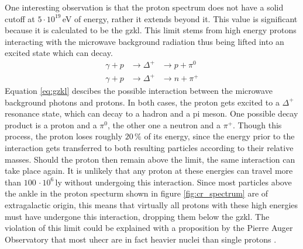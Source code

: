 \documentclass[abstract,toc,los,lof,english,10pt,glossary,acronyms]{jluthesis}
\begin{document}
One interesting observation is that the proton spectrum does not have a solid cutoff at $5\cdot10^{19}$\,eV of energy, rather it extends beyond it. This value is significant because it is calculated to be the \acrfull{gzkl}\cite{2021APh...12602526B}. This limit stems from high energy protons interacting with the microwave background radiation thus being lifted into an excited state which can decay.
\begin{equation}\label{eq:gzkl}
	\begin{aligned}
		\gamma + p &\rightarrow \Delta^+ &\rightarrow p + \pi^0 \\
		\gamma + p &\rightarrow \Delta^+ &\rightarrow n + \pi^+
	\end{aligned}
\end{equation}
Equation \ref{eq:gzkl} descibes the possible interaction between the microwave background photons and protons. In both cases, the proton gets excited to a $\Delta^+$ resonance state, which can decay to a hadron and a pi meson. One possible decay product is a proton and a $\pi^0$, the other one a neutron and a $\pi^+$. Though this process, the proton loses roughly $20\,\%$ of its energy, since the energy prior to the interaction gets transferred to both resulting particles according to their relative masses. Should the proton then remain above the limit, the same interaction can take place again. It is unlikely that any proton at these energies can travel more than $100\,\cdot10^6\,\text{ly}$ without undergoing this interaction. Since most particles above the ankle in the proton specturm shown in figure \ref{fig:cr_spectrum} are of extragalactic origin, this means that virtually all protons with these high energies must have undergone this interaction, dropping them below the \acrshort{gzkl}.
The violation of this limit could be explained with a proposition by the Pierre Auger Observatory that most \acrshort{uhecr} are in fact heavier nuclei than single protons \cite{thepierreaugercollaboration2017inferences}.
\end{document}
